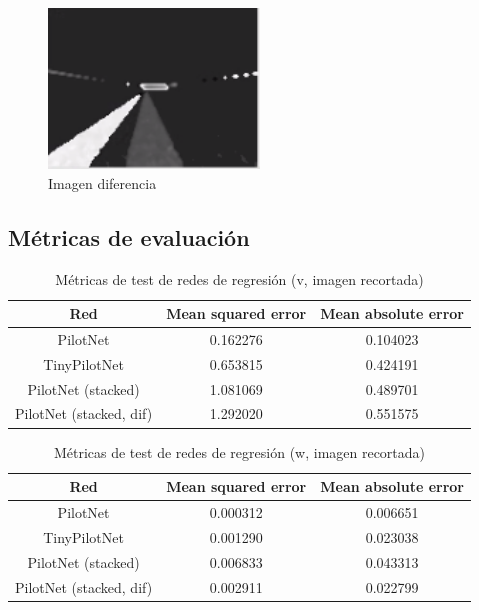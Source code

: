 \begin{figure}
\begin{center}
	\includegraphics[width=0.5\textwidth]{figures/Regresion/dif_gray_128.png}
   \caption{Imagen diferencia}
	\label{fig.diferencia_reg}
\end{center}
\end{figure}


\subsection{Métricas de evaluación}

\begin{table}[H]
\centering
\caption{Métricas de test de redes de regresión (v, imagen recortada)}
\label{metricas_regresion_recortada_v}
\begin{tabular}{c|c|c|}
\cline{1-3}
                        \multicolumn{1}{|c|}{Red}    & Mean squared error       & Mean absolute error             \\ \hline
\multicolumn{1}{|c|}{PilotNet}    & 0.162276   & 0.104023   \\ \hline
\multicolumn{1}{|c|}{TinyPilotNet}     & 0.653815      & 0.424191   \\ \hline
\multicolumn{1}{|c|}{PilotNet (stacked)}   & 1.081069    & 0.489701   \\ \hline
\multicolumn{1}{|c|}{PilotNet (stacked, dif)}     & 1.292020    & 0.551575        \\ \hline
\end{tabular}
\end{table}


\begin{table}[H]
\centering
\caption{Métricas de test de redes de regresión (w, imagen recortada)}
\label{metricas_regresion_recortada_w}
\begin{tabular}{c|c|c|}
\cline{1-3}
                        \multicolumn{1}{|c|}{Red}    & Mean squared error       & Mean absolute error             \\ \hline
\multicolumn{1}{|c|}{PilotNet}    & 0.000312   &  0.006651   \\ \hline
\multicolumn{1}{|c|}{TinyPilotNet}     & 0.001290      & 0.023038   \\ \hline
\multicolumn{1}{|c|}{PilotNet (stacked)}   & 0.006833    & 0.043313  \\ \hline
\multicolumn{1}{|c|}{PilotNet (stacked, dif)}     & 0.002911    & 0.022799        \\ \hline
\end{tabular}
\end{table}




